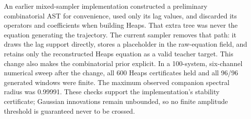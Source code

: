 An earlier mixed-sampler implementation constructed a preliminary
combinatorial AST for convenience, used only its lag values, and discarded its
operators and coefficients when building Heaps. That extra tree was never the
equation generating the trajectory. The current sampler removes that path:
it draws the lag support directly, stores a placeholder in the raw-equation
field, and retains only the reconstructed Heaps equation as a valid teacher
target. This change also makes the combinatorial prior explicit. In a
100-system, six-channel numerical sweep after the change, all 600 Heaps
certificates held and all 96/96 generated windows were finite. The maximum
observed companion spectral radius was 0.99991. These checks support the
implementation's stability certificate; Gaussian innovations remain
unbounded, so no finite amplitude threshold is guaranteed never to be crossed.
